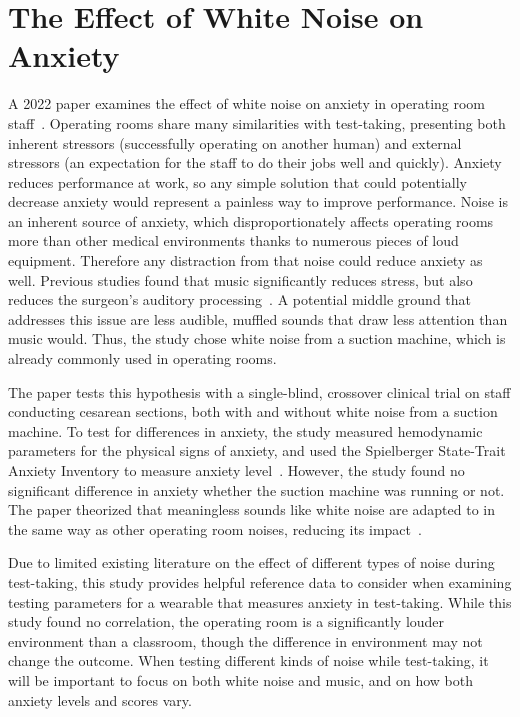 \documentclass[journal]{IEEEtran}
\begin{document}
\section{The Effect of White Noise on Anxiety}
A 2022 paper examines the effect of white noise on anxiety in operating room staff~\cite{ShahrokhiShabnam2022Teow}. Operating rooms share many similarities with test-taking, presenting both inherent stressors (successfully operating on another human) and external stressors (an expectation for the staff to do their jobs well and quickly). Anxiety reduces performance at work, so any simple solution that could potentially decrease anxiety would represent a painless way to improve performance. Noise is an inherent source of anxiety, which disproportionately affects operating rooms more than other medical environments thanks to numerous pieces of loud equipment. Therefore any distraction from that noise could reduce anxiety as well. Previous studies found that music significantly reduces stress, but also reduces the surgeon's auditory processing~\cite[p.~2]{ShahrokhiShabnam2022Teow}. A potential middle ground that addresses this issue are less audible, muffled sounds that draw less attention than music would. Thus, the study chose white noise from a suction machine, which is already commonly used in operating rooms.

The paper tests this hypothesis with a single-blind, crossover clinical trial on staff conducting cesarean sections, both with and without white noise from a suction machine. To test for differences in anxiety, the study measured hemodynamic parameters for the physical signs of anxiety, and used the Spielberger State-Trait Anxiety Inventory to measure anxiety level~\cite[pg.~1]{ShahrokhiShabnam2022Teow}. However, the study found no significant difference in anxiety whether the suction machine was running or not. The paper theorized that meaningless sounds like white noise are adapted to in the same way as other operating room noises, reducing its impact~\cite[pg.~3]{ShahrokhiShabnam2022Teow}.

Due to limited existing literature on the effect of different types of noise during test-taking, this study provides helpful reference data to consider when examining testing parameters for a wearable that measures anxiety in test-taking. While this study found no correlation, the operating room is a significantly louder environment than a classroom, though the difference in environment may not change the outcome. When testing different kinds of noise while test-taking, it will be important to focus on both white noise and music, and on how both anxiety levels and scores vary.
\end{document}

